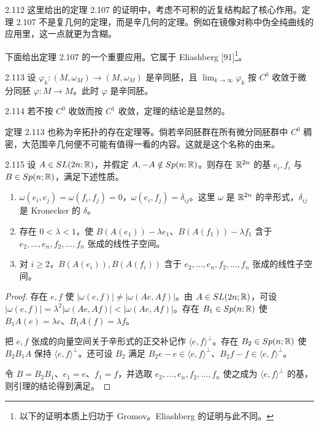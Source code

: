 \begin{remark}{2.112}
  这里给出的定理 2.107 的证明中，考虑不可积的近复结构起了核心作用。定理 2.107 不是复几何的定理，而是辛几何的定理。例如在镜像对称中伪全纯曲线的应用里，这一点就更为含糊。
\end{remark}

下面给出定理 2.107 的一个重要应用。它属于 Eliashberg [91]\footnote{以下的证明本质上归功于 Gromov。Eliashberg 的证明与此不同。}。

\begin{theorem}{2.113}
  设 $\varphi_k\colon(M,\omega_M)\to(M,\omega_M)$ 是辛同胚，且 $\lim_{k\to\infty}\varphi_k$ 按 $C^0$ 收敛于微分同胚 $\varphi\colon M\to M$。此时 $\varphi$ 是辛同胚。
\end{theorem}

\begin{remark}{2.114}
  若不按 $C^0$ 收敛而按 $C^1$ 收敛，定理的结论是显然的。
\end{remark}

定理 2.113 也称为辛拓扑的存在定理等。倘若辛同胚群在所有微分同胚群中 $C^0$ 稠密，大范围辛几何便不可能有值得一看的内容。这就是这个名称的由来。


\begin{lemma*}{2.115}
  设 $A\in SL(2n;\mathbb{R})$，并假定 $A,-A\notin Sp(n;\mathbb{R})$。则存在 $\mathbb{R}^{2n}$ 的基 $e_i,f_i$ 与 $B\in Sp(n;\mathbb{R})$，满足下述性质。
  \begin{enumerate}[label=（\arabic*）,leftmargin=2.4em]
    \item $\omega(e_i,e_j)=\omega(f_i,f_j)=0$，$\omega(e_i,f_j)=\delta_{ij}$。这里 $\omega$ 是 $\mathbb{R}^{2n}$ 的辛形式，$\delta_{ij}$ 是 Kronecker 的 $\delta$。
    \item 存在 $0<\lambda<1$，使 $B(A(e_1))-\lambda e_1$、$B(A(f_1))-\lambda f_1$ 含于 $e_2,\dots,e_n,f_2,\dots,f_n$ 张成的线性子空间。
    \item 对 $i\ge2$，$B(A(e_i)),B(A(f_i))$ 含于 $e_2,\dots,e_n,f_2,\dots,f_n$ 张成的线性子空间。
  \end{enumerate}
\end{lemma*}

\begin{proof}
  存在 $e,f$ 使 $|\omega(e,f)|\ne|\omega(Ae,Af)|$。由 $A\in SL(2n;\mathbb{R})$，可设 $|\omega(e,f)|=\lambda^2|\omega(Ae,Af)|<|\omega(Ae,Af)|$。存在 $B_1\in Sp(n;\mathbb{R})$ 使 $B_1A(e)=\lambda e$、$B_1A(f)=\lambda f$。

  把 $e,f$ 张成的向量空间关于辛形式的正交补记作 $\langle e,f\rangle^\perp$。存在 $B_2\in Sp(n;\mathbb{R})$ 使 $B_2B_1A$ 保持 $\langle e,f\rangle^\perp$。还可设 $B_2$ 满足 $B_2e-e\in\langle e,f\rangle^\perp$、$B_2f-f\in\langle e,f\rangle^\perp$。

  令 $B=B_2B_1$、$e_1=e$、$f_1=f$，并选取 $e_2,\dots,e_n,f_2,\dots,f_n$ 使之成为 $\langle e,f\rangle^\perp$ 的基，则引理的结论得到满足。
\end{proof}

